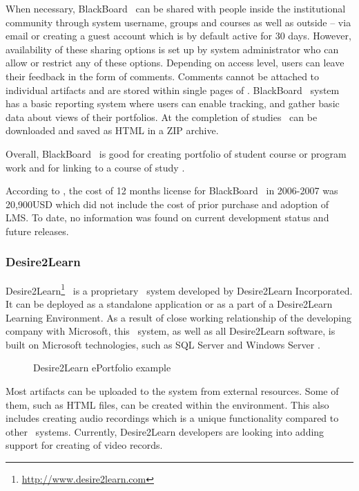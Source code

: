 When necessary, BlackBoard \ep~can be shared with people inside the
institutional community through system username, groups and courses as well as
outside -- via email or creating a guest account which is by default active for
30 days. However, availability of these sharing options is set up by system
administrator who can allow or restrict any of these options. Depending on
access level, users can leave their feedback in the form of comments. Comments
cannot be attached to individual artifacts and are stored within single pages of
\ep. BlackBoard \ep~system has a basic reporting system where users can enable
tracking, and gather basic data about views of their portfolios. At the
completion of studies \ep~can be downloaded and saved as HTML in a ZIP archive.

Overall, BlackBoard \ep~is good for creating portfolio of student course or
program work and for linking to a course of study
\citep{UniversityofTorontoScarborough2010}. 

According to \citet{Sweat-Guy2007}, the cost of 12 months license for
BlackBoard \ep~in 2006-2007 was 20,900USD which did not include the cost of
prior purchase and adoption of LMS. To date, no information was found on current
development status and future releases.

\subsubsection{Desire2Learn}
Desire2Learn\footnote{\url{http://www.desire2learn.com}} \ep~is a proprietary
\ep~system developed by Desire2Learn Incorporated. It can be deployed as a
standalone application or as a part of a Desire2Learn Learning Environment. As a
result of close working relationship of the developing company with Microsoft,
this \ep~system, as well as all Desire2Learn software, is built on Microsoft
technologies, such as SQL Server and Windows Server \citep{AAEEBL2011a}.

\begin{figure}[htb]
\centering
\setlength\fboxsep{0pt}
\setlength\fboxrule{0.5pt}
\fbox{\texttt{[image: CH4-F7-D2L]}}
\caption[Desire2Learn ePortfolio example]{Desire2Learn ePortfolio example
\citep{Desire2LearnIncorporated2011}}
\label{fig:d2ep} 
\end{figure}

Most artifacts can be uploaded to the system from external resources. Some of
them, such as HTML files, can be created within the environment. This also
includes creating audio recordings which is a unique functionality compared to
other \ep~systems. Currently, Desire2Learn developers are looking into adding
support for creating of video records.

